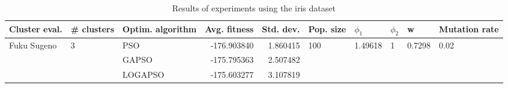 \begin{table}
\centering
\caption{Results of experiments using the iris dataset}
\begin{tabular}{lllrrlllll}
\toprule
               Cluster eval. &        \# clusters & Optim. algorithm &  Avg. fitness &  Std. dev. &            Pop. size &               $\phi_{1}$ &         $\phi_{2}$ &                       w &         Mutation rate \\
\midrule
\multirow{3}{*}{Fuku Sugeno} & \multirow{3}{*}{3} &              PSO &   -176.903840 &   1.860415 & \multirow{3}{*}{100} & \multirow{3}{*}{1.49618} & \multirow{3}{*}{1} & \multirow{3}{*}{0.7298} & \multirow{3}{*}{0.02} \\
                             &                    &            GAPSO &   -175.795363 &   2.507482 &                      &                          &                    &                         &                       \\
                             &                    &          LOGAPSO &   -175.603277 &   3.107819 &                      &                          &                    &                         &                       \\
\bottomrule
\end{tabular}
\end{table}
